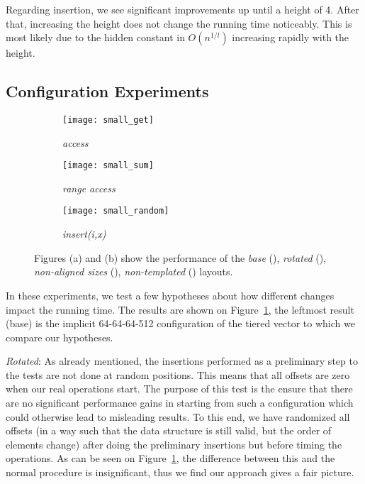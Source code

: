 Regarding insertion, we see significant improvements up until a height of 4. After that, increasing the height does not change the running time noticeably. This is most likely due to the hidden constant in $O(n^{1/l})$ increasing rapidly with the height.



\subsection{Configuration Experiments}

\begin{figure}
    \centering
    \begin{subfigure}[b]{0.3\textwidth}
        \texttt{[image: small\_get]}
        \caption{\textit{access}}
    \end{subfigure}
    \begin{subfigure}[b]{0.3\textwidth}
        \texttt{[image: small\_sum]}
        \caption{\textit{range access}}
    \end{subfigure}
    \begin{subfigure}[b]{0.3\textwidth}
        \texttt{[image: small\_random]}
        \caption{\textit{insert(i,x)}}
    \end{subfigure}
    \caption{Figures (a) and (b) show the performance of the
    \textit{base} (\protect\purple),
    \textit{rotated} (\protect\green), 
    \textit{non-aligned sizes} (\protect\blue),
    \textit{non-templated} (\protect\orange)
    layouts.}
\label{fig:test_minor}
\end{figure}

In these experiments, we test a few hypotheses about how different changes
impact the running time. The results are shown on
Figure~\ref{fig:test_minor}, the leftmost result (base) is
the implicit 64-64-64-512 configuration of the tiered vector 
to which we compare our hypotheses.

\textit{Rotated}: 
As already mentioned, the insertions performed as a
preliminary step to the tests are not done at random positions.
This means that all offsets are zero when our real operations
start. The purpose of this test is the ensure that
there are no significant performance gains in starting
from such a configuration which could otherwise
lead to misleading results.
To this end, we have randomized all
offsets (in a way such that the data structure is still valid, but the
order of elements change) after doing the preliminary insertions
but before timing the operations. As can be seen on
Figure~\ref{fig:test_minor}, the difference between this and the normal
procedure is insignificant, thus we find our approach gives a fair picture.



